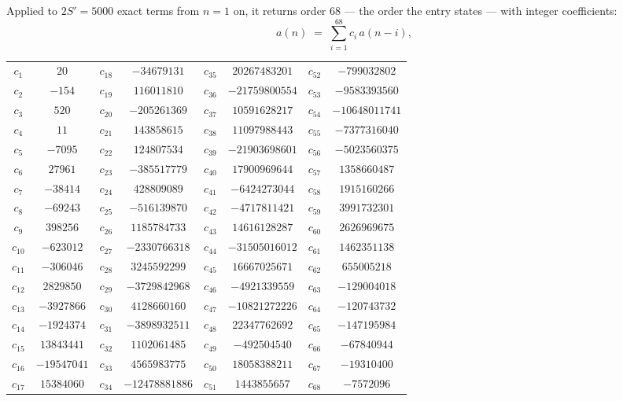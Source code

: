 \documentclass[11pt,a4paper]{article}
\theoremstyle{plain}
\theoremstyle{definition}
\begin{document}
Applied to $2S'=5000$ exact terms from $n=1$ on, it returns order $68$ --- the
order the entry states --- with integer coefficients:
\[
a(n)\;=\;\sum_{i=1}^{68}c_i\,a(n-i),
\]
\begin{center}\small
\begin{tabular}{cccccccc}
$c_{1}$ & $20$ & $c_{18}$ & $-34679131$ & $c_{35}$ & $20267483201$ & $c_{52}$ & $-799032802$ \\
$c_{2}$ & $-154$ & $c_{19}$ & $116011810$ & $c_{36}$ & $-21759800554$ & $c_{53}$ & $-9583393560$ \\
$c_{3}$ & $520$ & $c_{20}$ & $-205261369$ & $c_{37}$ & $10591628217$ & $c_{54}$ & $-10648011741$ \\
$c_{4}$ & $11$ & $c_{21}$ & $143858615$ & $c_{38}$ & $11097988443$ & $c_{55}$ & $-7377316040$ \\
$c_{5}$ & $-7095$ & $c_{22}$ & $124807534$ & $c_{39}$ & $-21903698601$ & $c_{56}$ & $-5023560375$ \\
$c_{6}$ & $27961$ & $c_{23}$ & $-385517779$ & $c_{40}$ & $17900969644$ & $c_{57}$ & $1358660487$ \\
$c_{7}$ & $-38414$ & $c_{24}$ & $428809089$ & $c_{41}$ & $-6424273044$ & $c_{58}$ & $1915160266$ \\
$c_{8}$ & $-69243$ & $c_{25}$ & $-516139870$ & $c_{42}$ & $-4717811421$ & $c_{59}$ & $3991732301$ \\
$c_{9}$ & $398256$ & $c_{26}$ & $1185784733$ & $c_{43}$ & $14616128287$ & $c_{60}$ & $2626969675$ \\
$c_{10}$ & $-623012$ & $c_{27}$ & $-2330766318$ & $c_{44}$ & $-31505016012$ & $c_{61}$ & $1462351138$ \\
$c_{11}$ & $-306046$ & $c_{28}$ & $3245592299$ & $c_{45}$ & $16667025671$ & $c_{62}$ & $655005218$ \\
$c_{12}$ & $2829850$ & $c_{29}$ & $-3729842968$ & $c_{46}$ & $-4921339559$ & $c_{63}$ & $-129004018$ \\
$c_{13}$ & $-3927866$ & $c_{30}$ & $4128660160$ & $c_{47}$ & $-10821272226$ & $c_{64}$ & $-120743732$ \\
$c_{14}$ & $-1924374$ & $c_{31}$ & $-3898932511$ & $c_{48}$ & $22347762692$ & $c_{65}$ & $-147195984$ \\
$c_{15}$ & $13843441$ & $c_{32}$ & $1102061485$ & $c_{49}$ & $-492504540$ & $c_{66}$ & $-67840944$ \\
$c_{16}$ & $-19547041$ & $c_{33}$ & $4565983775$ & $c_{50}$ & $18058388211$ & $c_{67}$ & $-19310400$ \\
$c_{17}$ & $15384060$ & $c_{34}$ & $-12478881886$ & $c_{51}$ & $1443855657$ & $c_{68}$ & $-7572096$ \\
\end{tabular}
\end{center}
\end{document}
